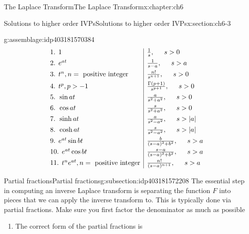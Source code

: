 \documentclass[oneside,10pt,]{book}
\numberwithin{equation}{section}
\newcommand{\abs}[1]{\left\vert#1\right\vert}
\numberwithin{equation}{section}
\newcommand{\amp}{&}
\begin{document}
\begin{chapterptx}{The Laplace Transform}{}{The Laplace Transform}{}{}{x:chapter:ch6}
\begin{sectionptx}{Solutions to higher order IVPs}{}{Solutions to higher order IVPs}{}{}{x:section:ch6-3}
\begin{introduction}{}
\begin{assemblage}{}{g:assemblage:idp403181570384}
\begin{equation*}
\begin{array}{l|l}
\text{1. } 1 \amp \frac{1}{s}, \hspace{.2in} s > 0 \\[4pt]
\text{2. } e^{at} \amp \frac{1}{s-a}, \hspace{.2in} s > a \\[4pt]
\text{3. } t^n, n=\text{ positive integer} \amp \frac{n!}{s^{n+1}}, \hspace{.2in} s > 0 \\[4pt]
\text{4. } t^p, p > -1 \amp \frac{\Gamma(p+1)}{s^{p+1}}, \hspace{.2in} s > 0 \\[4pt]
\text{5. } \sin at \amp \frac{a}{s^2 + a^2}, \hspace{.2in} s > 0 \\[4pt]
\text{6. } \cos at \amp \frac{s}{s^2 + a^2}, \hspace{.2in} s > 0 \\[4pt]
\text{7. } \sinh at \amp \frac{a}{s^2 - a^2}, \hspace{.2in} s > \abs{a} \\[4pt]
\text{8. } \cosh at \amp \frac{s}{s^2 - a^2}, \hspace{.2in} s > \abs{a} \\[4pt]
\text{9. } e^{at} \sin bt \amp \frac{b}{(s-a)^2 + b^2}, \hspace{.2in} s > a\\[4pt]
\text{10. } e^{at} \cos bt \amp \frac{s - a}{(s-a)^2 + b^2}, \hspace{.2in} s > a \\[4pt]
\text{11. } t^n e^{at}, n=\text{ positive integer} \amp \frac{n!}{(s-a)^{n+1}}, \hspace{.2in} s > a
\end{array}
\end{equation*}
%
\end{assemblage}
\end{introduction}%
%
%
\typeout{************************************************}
\typeout{************************************************}
%
\begin{subsectionptx}{Partial fractions}{}{Partial fractions}{}{}{g:subsection:idp403181572208}
The essential step in computing an inverse Laplace transform is separating the function \(F\) into pieces that we can apply the inverse transform to. This is typically done via partial fractions. Make sure you first factor the denominator as much as possible%
\begin{enumerate}
\item{}The correct form of the partial fractions is%

\end{enumerate}
\end{subsectionptx}
\end{sectionptx}
\end{chapterptx}
\end{document}

